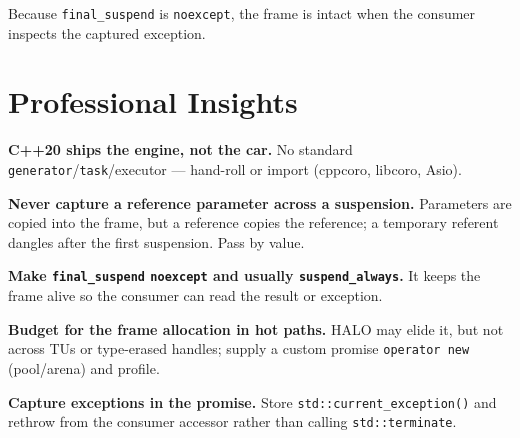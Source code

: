 Because \texttt{final\_suspend} is \texttt{noexcept}, the frame is intact when the consumer inspects the captured exception.

\section{Professional Insights}
\label{sec:c20-coroutines-i-insights}

\textbf{C++20 ships the engine, not the car.} No standard \texttt{generator}/\texttt{task}/executor --- hand-roll or import (cppcoro, libcoro, Asio).

\textbf{Never capture a reference parameter across a suspension.} Parameters are copied into the frame, but a reference copies the reference; a temporary referent dangles after the first suspension. Pass by value.

\textbf{Make \texttt{final\_suspend} \texttt{noexcept} and usually \texttt{suspend\_always}.} It keeps the frame alive so the consumer can read the result or exception.

\textbf{Budget for the frame allocation in hot paths.} HALO may elide it, but not across TUs or type-erased handles; supply a custom promise \texttt{operator new} (pool/arena) and profile.

\textbf{Capture exceptions in the promise.} Store \texttt{std::current\_exception()} and rethrow from the consumer accessor rather than calling \texttt{std::terminate}.
